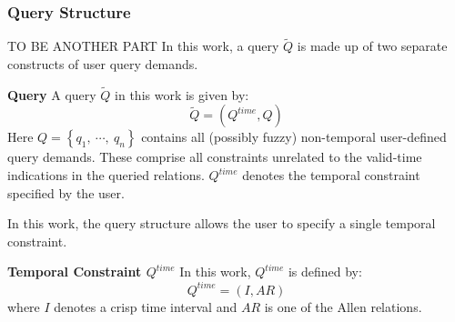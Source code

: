 \subsubsection{Query Structure} TO BE ANOTHER PART
In this work, a query $\tilde{Q}$ is made up of two separate constructs of user query demands.


\begin{svgraybox}
\vspace{-10pt}
\begin{definition}
\textbf{Query}
A query $\tilde{Q}$ in this work is given by:
\begin{equation}
\label{eq:query-specification}
\tilde{Q} = \left( Q^{time}, Q \right)
\end{equation}
Here $Q = \left \lbrace q_1,\ \cdots,\ q_n \right \rbrace$ contains all (possibly fuzzy) non-temporal user-defined query demands. These comprise all constraints unrelated to the valid-time indications in the queried relations. $Q^{time}$ denotes the temporal constraint specified by the user.
\end{definition}
\vspace{-10pt}
\end{svgraybox}

In this work, the query structure allows the user to specify a single temporal constraint.

\begin{svgraybox}
\vspace{-10pt}
\begin{definition}
\textbf{Temporal Constraint $Q^{time}$}
In this work, $Q^{time}$ is defined by:
\begin{equation}
Q^{time} = \left( I,AR \right)
\end{equation}
where $I$ denotes a crisp time interval and $AR$ is one of the Allen relations.
\end{definition}
\vspace{-10pt}
\end{svgraybox}

